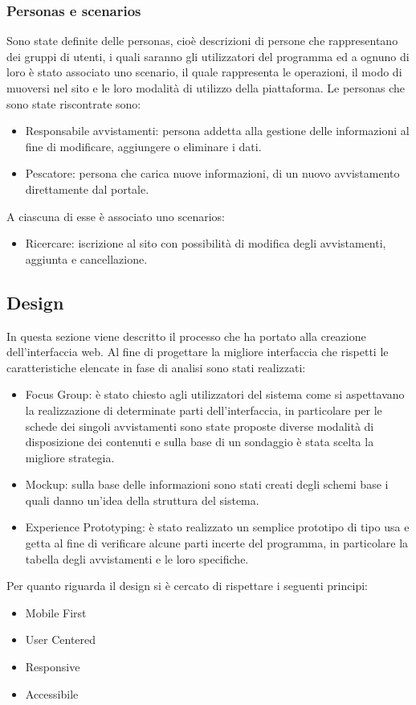 \documentclass[a4paper,final,12pt]{report}
\begin{document}
\subsubsection{Personas e scenarios}
Sono state definite delle personas, cioè descrizioni di persone che rappresentano dei gruppi di utenti, i quali saranno gli utilizzatori del programma ed a ognuno di loro è stato associato uno scenario, il quale rappresenta le operazioni, il modo di muoversi nel sito e le loro modalità di utilizzo della piattaforma.
Le personas che sono state riscontrate sono:
\begin{itemize}
 \item Responsabile avvistamenti: persona addetta alla gestione delle informazioni al fine di modificare, aggiungere o eliminare i dati. 
\item Pescatore: persona che carica nuove informazioni, di un nuovo avvistamento direttamente dal portale.
 \end{itemize} 
 A ciascuna di esse è associato uno scenarios:
 \begin{itemize}
 \item Ricercare: iscrizione al sito con possibilità di modifica degli avvistamenti, aggiunta e cancellazione.
 \end{itemize}

\subsection{Design}
In questa sezione viene descritto il processo che ha portato alla creazione dell'interfaccia web.
Al fine di progettare la migliore interfaccia che rispetti le caratteristiche elencate in fase di analisi sono stati realizzati:
\begin{itemize}
\item Focus Group: è stato chiesto agli utilizzatori del sistema come si aspettavano la realizzazione di determinate parti dell'interfaccia, in particolare per le schede dei singoli avvistamenti sono state proposte diverse modalità di disposizione dei contenuti e sulla base di un sondaggio è stata scelta la migliore strategia.
\item Mockup: sulla base delle informazioni sono stati creati degli schemi base i quali danno un'idea della struttura del sistema.
\item Experience Prototyping: è stato realizzato un semplice prototipo di tipo usa e getta al fine di verificare alcune parti incerte del programma, in particolare la tabella degli avvistamenti e le loro specifiche.
\end{itemize}
Per quanto riguarda il design si è cercato di rispettare i seguenti principi:
\begin{itemize}
\item Mobile First
\item User Centered
\item Responsive
\item Accessibile
\end{itemize}
\end{document}
